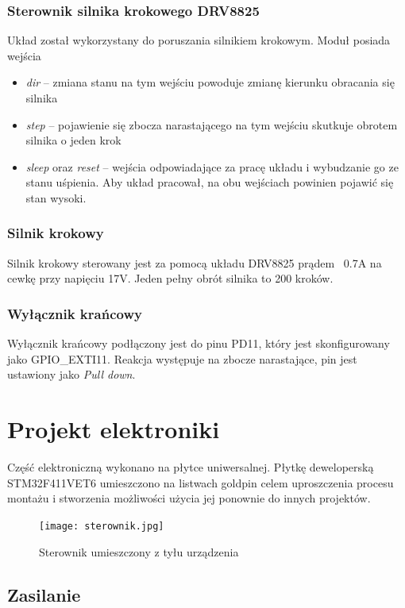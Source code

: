 \documentclass[10pt, a4paper]{article}
\begin{document}
\subsubsection{Sterownik silnika krokowego DRV8825}
Układ został wykorzystany do poruszania silnikiem krokowym. Moduł posiada wejścia
\begin{itemize}
    \item \emph{dir} -- zmiana stanu na tym wejściu powoduje zmianę kierunku obracania się silnika
    \item \emph{step} -- pojawienie się zbocza narastającego na tym wejściu skutkuje obrotem silnika o jeden krok
    \item \emph{sleep} oraz \emph{reset} -- wejścia odpowiadające za pracę układu i wybudzanie go ze stanu uśpienia. Aby układ pracował, na obu wejściach powinien pojawić się stan wysoki.
\end{itemize}
\subsubsection{Silnik krokowy}
Silnik krokowy sterowany jest za pomocą układu DRV8825 prądem ~0.7A na cewkę przy napięciu 17V. Jeden pełny obrót silnika to 200 kroków. 

\subsubsection{Wyłącznik krańcowy}
Wyłącznik krańcowy podłączony jest do pinu PD11, który jest skonfigurowany jako GPIO{\_}EXTI11. Reakcja występuje na zbocze narastające, pin jest ustawiony jako \emph{Pull down}. 



\section{Projekt elektroniki}


Część elektroniczną wykonano na płytce uniwersalnej. Płytkę deweloperską STM32F411VET6 umieszczono na listwach goldpin celem uproszczenia procesu montażu i stworzenia możliwości użycia jej ponownie do innych projektów. 

\begin{figure}[H]
	\centering
	\texttt{[image: sterownik.jpg]}
	\caption{Sterownik umieszczony z tyłu urządzenia}
	\label{fig:Sterownik}
\end{figure}
\newpage
\subsection{Zasilanie}
\end{document}
